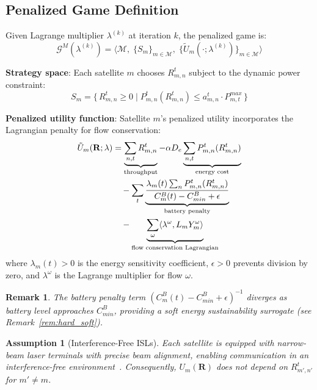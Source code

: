 \documentclass[journal]{IEEEtran}
\newtheorem{remark}{Remark}
\newtheorem{assumption}{Assumption}
\newcommand{\CB}{C^{B}}
\newcommand{\CBmin}{C^{B}_{min}}
\newcommand{\calM}{\mathcal{M}}
\newcommand{\calG}{\mathcal{G}}
\newcommand{\bfR}{\mathbf{R}}
\newcommand{\Rmn}{R_{m,n}^{t}}
\begin{document}
\subsection{Penalized Game Definition}

Given Lagrange multiplier $\lambda^{(k)}$ at iteration $k$, the penalized game is:
\begin{equation}
    \calG^M(\lambda^{(k)}) = \bigl\langle \calM,\;
    \{S_m\}_{m\in\calM},\;
    \{\tilde{U}_m(\cdot;\lambda^{(k)})\}_{m\in\calM}
    \bigr\rangle
\end{equation}

\textbf{Strategy space}: Each satellite $m$ chooses
$R_{m,n}^t$ subject to the dynamic power constraint:
\begin{equation}
    S_m = \bigl\{\, R_{m,n}^t \geq 0 \;\big|\;
    P_{m,n}^t(R_{m,n}^t) \leq
    a_{m,n}^t \cdot P_{m,t}^{max} \,\bigr\}
    \label{eq:strategy_space}
\end{equation}

\textbf{Penalized utility function}: Satellite $m$'s
penalized utility incorporates the Lagrangian penalty for flow conservation:
\begin{align}
    \tilde{U}_m(\bfR;\lambda) &=
    \underbrace{\sum_{n,t} \Rmn}_{\text{throughput}}
    - \alpha D_e \underbrace{\sum_{n,t}
    P_{m,n}^t(\Rmn)}_{\text{energy cost}}
    \notag\\
    &\quad - \sum_t
    \underbrace{\frac{\lambda_m(t)
    \sum_n P_{m,n}^t(\Rmn)}%
    {\CB_m(t)-\CBmin+\epsilon}}_{\text{battery penalty}}
    \notag\\
    &\quad - \underbrace{\sum_\omega \langle
    \lambda^{\omega},
    L_m Y_m^\omega \rangle}_{\text{flow conservation
    Lagrangian}}
    \label{eq:utility}
\end{align}
where $\lambda_m(t)>0$ is the energy sensitivity coefficient, $\epsilon>0$ prevents division by zero, and $\lambda^\omega$ is the Lagrange multiplier for flow $\omega$.

\begin{remark}
The battery penalty term $(\CB_m(t)-\CBmin+\epsilon)^{-1}$ diverges as battery level approaches $\CBmin$, providing a soft energy sustainability surrogate (see Remark~\ref{rem:hard_soft}).
\end{remark}

\begin{assumption}[Interference-Free ISLs]
\label{assm:interference_free}
Each satellite is equipped with narrow-beam laser terminals with precise beam alignment, enabling communication in an interference-free environment~\cite{li2023energy,li2023deepisl}. Consequently, $U_m(\bfR)$ does not depend on $R_{m',n'}^t$ for $m'\neq m$.
\end{assumption}
\end{document}
